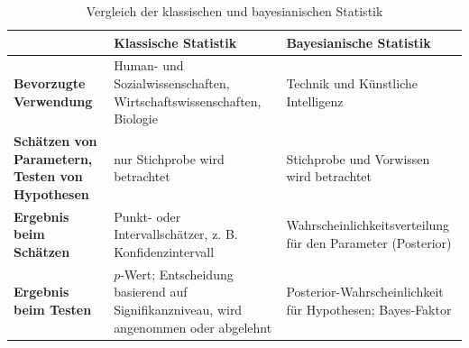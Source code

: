 \documentclass[a4paper,12pt]{article}
\begin{document}
\begin{table}[h!]
  \centering
  \begin{tabular}{|p{3cm}|p{5cm}|p{6cm}|}
    \hline
    \textbf{} & \textbf{Klassische Statistik} & \textbf{Bayesianische Statistik} \\ \hline
    \textbf{Bevorzugte Verwendung} & Human- und Sozialwissenschaften, Wirtschaftswissenschaften, Biologie & Technik und Künstliche Intelligenz \\ 
    \hline
    \textbf{Schätzen von Parametern, Testen von Hypothesen} & nur Stichprobe wird betrachtet & Stichprobe und Vorwissen wird betrachtet \\
    \hline
    \textbf{Ergebnis beim Schätzen} & Punkt- oder Intervallschätzer, z. B. Konfidenzintervall & Wahrscheinlichkeitsverteilung für den Parameter (Posterior) 
    \\ \hline
  \textbf{Ergebnis beim Testen} & \(p\)-Wert; Entscheidung basierend auf Signifikanzniveau, wird angenommen oder abgelehnt & Posterior-Wahrscheinlichkeit für Hypothesen; Bayes-Faktor \\ 
  \hline
  \end{tabular}
  \caption{Vergleich der klassischen und bayesianischen Statistik}
  \label{tab:vergleich_verwendung}
\end{table}
\end{document}
